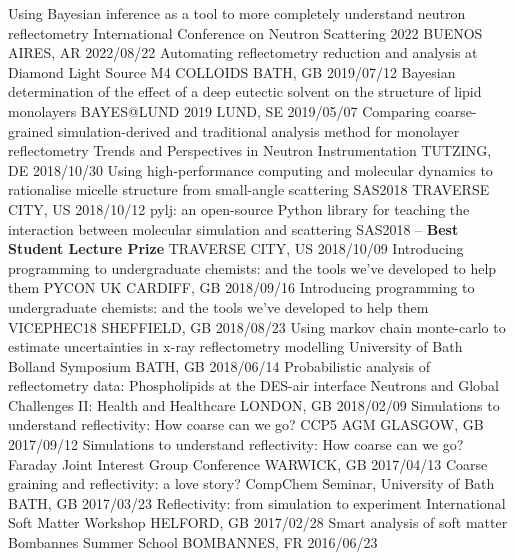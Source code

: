 \begin{cvhonors} 
  \cvhonor
    {Using Bayesian inference as a tool to more completely understand neutron reflectometry}
    {International Conference on Neutron Scattering 2022}
    {BUENOS AIRES, AR}
    {2022/08/22}
  \cvhonor
    {Automating reflectometry reduction and analysis at Diamond Light Source}
    {M4 COLLOIDS}
    {BATH, GB}
    {2019/07/12}
  \cvhonor
    {Bayesian determination of the effect of a deep eutectic solvent on the structure of lipid monolayers}
    {BAYES@LUND 2019}
    {LUND, SE}
    {2019/05/07}
  \cvhonor
    {Comparing coarse-grained simulation-derived and traditional analysis method for monolayer reflectometry}
    {Trends and Perspectives in Neutron Instrumentation}
    {TUTZING, DE}
    {2018/10/30} 
  \cvhonor
    {Using high-performance computing and molecular dynamics to rationalise micelle structure from small-angle scattering}
    {SAS2018}
    {TRAVERSE CITY, US}
    {2018/10/12}
  \cvhonor
    {pylj: an open-source Python library for teaching the interaction between molecular simulation and scattering}
	{SAS2018 -- \textbf{Best Student Lecture Prize}}
    {TRAVERSE CITY, US}
    {2018/10/09}
  \cvhonor
    {Introducing programming to undergraduate chemists: and the tools we've developed to help them}
    {PYCON UK}
    {CARDIFF, GB}
    {2018/09/16}
  \cvhonor
    {Introducing programming to undergraduate chemists: and the tools we've developed to help them}
    {VICEPHEC18}
    {SHEFFIELD, GB}
    {2018/08/23}
  \cvhonor
    {Using markov chain monte-carlo to estimate uncertainties in x-ray reflectometry modelling}
    {University of Bath Bolland Symposium}
    {BATH, GB}
    {2018/06/14}
  \cvhonor
    {Probabilistic analysis of reflectometry data: Phospholipids at the DES-air interface}
    {Neutrons and Global Challenges II: Health and Healthcare}
    {LONDON, GB}
    {2018/02/09}
  \cvhonor
    {Simulations to understand reflectivity: How coarse can we go?}
    {CCP5 AGM}
    {GLASGOW, GB}
    {2017/09/12}
  \cvhonor
    {Simulations to understand reflectivity: How coarse can we go?}
    {Faraday Joint Interest Group Conference}
    {WARWICK, GB}
    {2017/04/13}
  \cvhonor
    {Coarse graining and reflectivity: a love story?}
    {CompChem Seminar, University of Bath}
    {BATH, GB}
    {2017/03/23}
  \cvhonor
    {Reflectivity: from simulation to experiment}
    {International Soft Matter Workshop}
    {HELFORD, GB}
    {2017/02/28}
  \cvhonor
    {Smart analysis of soft matter}
    {Bombannes Summer School}
    {BOMBANNES, FR}
    {2016/06/23}
\end{cvhonors}
